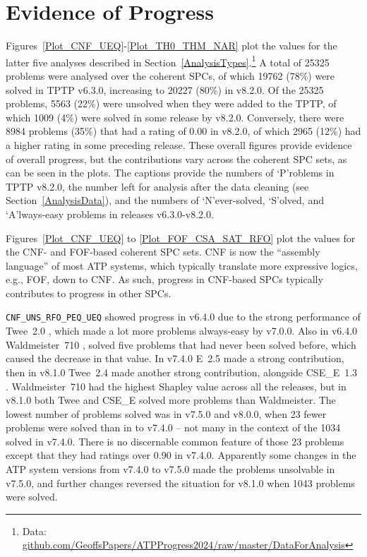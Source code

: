 \documentclass[runningheads]{llncs}
\begin{document}
\section{Evidence of Progress}
\label{Evidence}

Figures~\ref{Plot_CNF_UEQ}-\ref{Plot_TH0_THM_NAR} plot the values for the latter five analyses
described in Section~\ref{AnalysisTypes}.\footnote{%
Data: \href{https://github.com/GeoffsPapers/ATPProgress2024/raw/master/DataForAnalysis}{github.com/GeoffsPapers/ATPProgress2024/raw/master/DataForAnalysis}}
A total of 25325 problems were analysed over the coherent SPCs, of which 19762 (78\%) were 
solved in TPTP v6.3.0, increasing to 20227 (80\%) in v8.2.0.
Of the 25325 problems, 5563 (22\%) were unsolved when they were added to the TPTP, of which 1009 
(4\%) were solved in some release by v8.2.0. 
Conversely, there were 8984 problems (35\%) that had a rating of 0.00 in v8.2.0, of which 2965 
(12\%) had a higher rating in some preceding release.
These overall figures provide evidence of overall progress, but the contributions vary across
the coherent SPC sets, as can be seen in the plots.
The captions provide the numbers of `P'roblems in TPTP v8.2.0, the number left for analysis 
after the data cleaning (see Section~\ref{AnalysisData}), and the numbers of `N'ever-solved, 
`S'olved, and `A'lways-easy problems in releases v6.3.0-v8.2.0.

Figures~\ref{Plot_CNF_UEQ} to \ref{Plot_FOF_CSA_SAT_RFO} plot the values for the CNF- and
FOF-based coherent SPC sets.
CNF is now the ``assembly language'' of most ATP systems, which typically translate more
expressive logics, e.g., FOF, down to CNF.
As such, progress in CNF-based SPCs typically contributes to progress in other SPCs.

{\tt CNF\_UNS\_RFO\_PEQ\_UEQ} showed progress in v6.4.0 due to the strong performance of
Twee~2.0 \cite{Sma21}, which made a lot more problems always-easy by v7.0.0.
Also in v6.4.0 Waldmeister~710 \cite{LH02}, solved five problems that had never been solved 
before, which caused the decrease in that value.
In v7.4.0 E~2.5 made a strong contribution, then in v8.1.0 Twee~2.4 made another strong 
contribution, alongside CSE\_E~1.3 \cite{XL+18}.
Waldmeister~710 had the highest Shapley value across all the releases, but in
v8.1.0 both Twee and CSE\_E solved more problems than Waldmeister.
The lowest number of problems solved was in v7.5.0 and v8.0.0, when 23 fewer problems were solved
than in to v7.4.0 -- not many in the context of the 1034 solved in v7.4.0.
There is no discernable common feature of those 23 problems except that they had ratings over
0.90 in v7.4.0.
Apparently some changes in the ATP system versions from v7.4.0 to v7.5.0 made the problems
unsolvable in v7.5.0, and further changes reversed the situation for v8.1.0 when 1043 problems
were solved.
 
\end{document}
